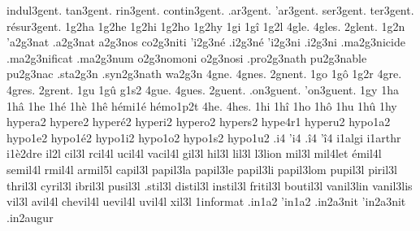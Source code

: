 {  indul3gent.
    tan3gent.
    rin3gent.
 contin3gent.
    .ar3gent.
    'ar3gent.
    ser3gent.
    ter3gent.
résur3gent.
%
1g2ha
1g2he
1g2hi
1g2ho
1g2hy
1gi
1gî
1g2l
4gle.
4gles.
2glent. %
    1g2n
  'a2g3nat     %
  .a2g3nat     %
   a2g3nos     %
  co2g3niti    %
  'i2g3né      %
  .i2g3né      %
  'i2g3ni      %
  .i2g3ni      %
 .ma2g3nicide  %
 .ma2g3nificat %
 .ma2g3num     %
   o2g3nomoni  %
   o2g3nosi    %
.pro2g3nath    %
  pu2g3nable   %
  pu2g3nac     %
.sta2g3n
.syn2g3nath    %
  wa2g3n
4gne.
4gnes.
2gnent. %
1go
1gô
1g2r
4gre.
4gres.
2grent. %
1gu
1gû
g1s2
4gue.
4gues.
   2guent.
.on3guent.
'on3guent.
%
1gy
1ha
1hâ
1he
1hé
1hè
1hê
                    hémi1é
                    hémo1p2t
4he.
4hes.
1hi
1hî
1ho
1hô
1hu
1hû
1hy
                    hypera2
                    hypere2
                    hyperé2
                    hyperi2
                    hypero2
                    hypers2
                    hype4r1
                    hyperu2
                    hypo1a2
                    hypo1e2 %
                    hypo1é2
                    hypo1i2
                    hypo1o2
                    hypo1s2
                    hypo1u2
.i4
'i4
.î4
'î4
                    i1algi
                    i1arthr
                    i1è2dre
    il2l
   cil3l
  rcil4l
  ucil4l
 vacil4l
   gil3l
   hil3l
   lil3l
     l3lion
   mil3l
   mil4let
  émil4l
 semil4l
  rmil4l
 armil5l
 capil3l
 papil3la
 papil3le
 papil3li
 papil3lom
 pupil3l
 piril3l
 thril3l
 cyril3l
 ibril3l
 pusil3l
 .stil3l
distil3l
instil3l
fritil3l
boutil3l
 vanil3lin
 vanil3lis
   vil3l
  avil4l
chevil4l
 uevil4l
  uvil4l
   xil3l
                    1informat %
                    .in1a2
                    'in1a2
                    .in2a3nit
                    'in2a3nit
                    .in2augur
}
